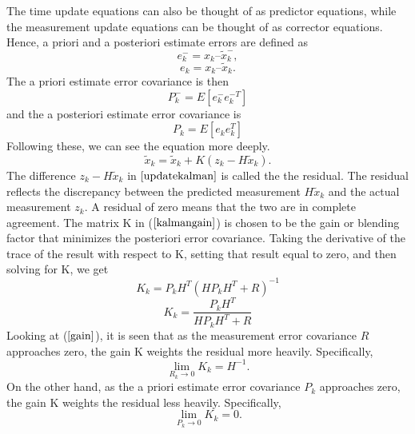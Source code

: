 \documentclass[a4paper,10pt]{report}
\begin{document}
The time update equations can also be thought of as predictor
equations, while the measurement update equations can be thought of
as corrector equations.
\newline
Hence, a priori and a posteriori estimate errors are defined as
\begin{equation}
e_k^- = x_k – \tilde x_k^- ,
\end{equation}
\begin{equation}
e_k =  x_k – \tilde x_k.
\end{equation}
The a priori estimate error covariance is then
\begin{equation}
P_k^- = E[ e_k^- e_k^{-T} ]
\end{equation}
and the a posteriori estimate error covariance is
\begin{equation}
P_k = E[e_k e_k^T]
\end{equation}
Following these, we can see the equation more deeply.
\begin{equation}
\tilde x_k = \tilde x_k + K(z_k-H\tilde x_k).
\label{updatekalman}
\end{equation}
The difference $z_k - H\tilde x_k$ in $\ref{updatekalman}$ is called
the the residual. The residual reflects the discrepancy between the
predicted measurement $H\tilde x_k$ and the actual measurement
$z_k$. A residual of zero means that the two are in complete
agreement. \newline
The matrix K in ($\ref{kalmangain}$) is
chosen to be the gain or blending factor that minimizes the
posteriori error covariance. Taking the derivative of the trace of
the result with respect to K, setting that result equal to zero, and
then solving for K, we get
\begin{equation}
K_k = P_kH^{T}(HP_kH^{T} + R)^{-1}
\end{equation}
\begin{equation}
K_k = \frac{P_kH^T}{HP_kH^T + R} \label{gain}
\end{equation}
Looking at ($\ref{gain}$), it is seen that as the measurement error
covariance $R$ approaches zero, the gain K weights the residual more
heavily. Specifically,
\begin{equation}
\mathop {\lim }\limits_{R_k \to 0 } {K_k} = H^{-1}.
\end{equation}
On the other hand, as the a priori estimate error covariance $P_k$
approaches zero, the gain K weights the residual less heavily.
Specifically,
\begin{equation}
\mathop {\lim }\limits_{P_k \to 0 } {K_k} = 0.
\end{equation}
\end{document}

